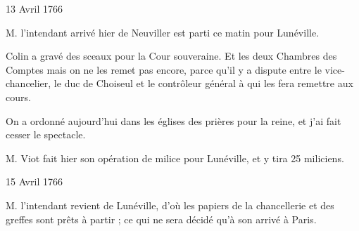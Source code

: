                      \begin{diary}{13 Avril 1766}{}


                           M. l'intendant arrivé hier de
                              Neuviller
                           est parti ce matin pour Lunéville. \bigskip



                           Colin a gravé des sceaux pour la
                              Cour souveraine.
                           Et les deux Chambres des Comptes mais on
                           ne les remet pas encore, parce qu'il y a
                           dispute entre le
                              vice-chancelier, le
                              duc de Choiseul et le contrôleur général à qui
                           les fera remettre aux cours. \bigskip


                         On a ordonné aujourd'hui dans les
                           églises des prières pour la reine,
                           et j'ai fait cesser le spectacle. \bigskip



                           M. Viot fait hier son opération de
                           milice pour Lunéville, et
                           y tira 25
                           miliciens. \bigskip


                     \end{diary}

                     \begin{diary}{15 Avril 1766}{}


                           M. l'intendant revient de
                              Lunéville, d'où
                           les papiers de la
                              chancellerie et des greffes
                           sont prêts à partir ; ce qui ne sera décidé
                           qu'à son arrivé à Paris. \bigskip


                     \end{diary}


